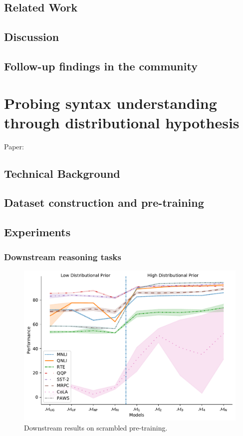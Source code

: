 \documentclass[letterpaper, 12pt]{report}
\begin{document}
\section{Related Work}
\label{sec:org90572c9}
\section{Discussion}
\label{sec:orgdd9c593}
\section{Follow-up findings in the community}
\label{sec:orgef6955a}

\clearpage
\chapter{Probing syntax understanding through distributional hypothesis}
\label{sec:org881cedf}

Paper: \cite{sinha2021}

\section{Technical Background}
\label{sec:org21235b5}
\section{Dataset construction and pre-training}
\label{sec:orgc04b18b}
\section{Experiments}
\label{sec:org987c7f3}
\subsection{Downstream reasoning tasks}
\label{sec:org3d7661e}

\begin{figure}[htbp]
\centering
\includegraphics[width=.9\linewidth]{figs/unnat_pt/main_result_plot.pdf}
\caption{Downstream results on scrambled pre-training.}
\end{figure}
\end{document}
